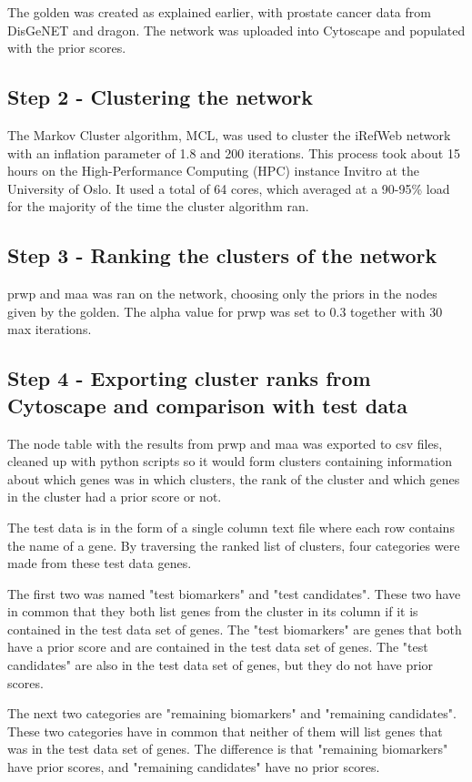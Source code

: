 The \gls{golden} was created as explained earlier, with prostate cancer data
from DisGeNET and \gls{dragon}. The network was uploaded into Cytoscape and
populated with the prior scores. 

\subsection{Step 2 - Clustering the network}
The Markov Cluster algorithm, MCL, was used to cluster the iRefWeb network with
an inflation parameter of 1.8 and 200 iterations. This process took about 15
hours on the High-Performance Computing (HPC) instance Invitro at the University
of Oslo. It used a total of 64 cores, which averaged at a 90-95\% load for the
majority of the time the cluster algorithm ran.

\subsection{Step 3 - Ranking the clusters of the network}
\gls{prwp} and \gls{maa} was ran on the network, choosing only the priors in the
nodes given by the \gls{golden}. The alpha value for \gls{prwp} was set to 0.3
together with 30 max iterations.

\subsection{Step 4 - Exporting cluster ranks from Cytoscape and comparison with test data}
The node table with the results from \gls{prwp} and \gls{maa} was exported to
csv files, cleaned up with python scripts so it would form clusters containing
information about which genes was in which clusters, the rank of the cluster and
which genes in the cluster had a prior score or not.

The test data is in the form of a single column text file where each row
contains the name of a gene. By traversing the ranked list of clusters, four
categories were made from these test data genes. 

The first two was named "test biomarkers" and "test candidates". These two have
in common that they both list genes from the cluster in its column if it is
contained in the test data set of genes. The "test biomarkers" are genes that
both have a prior score and are contained in the test data set of genes. The
"test candidates" are also in the test data set of genes, but they do not have
prior scores.

The next two categories are "remaining biomarkers" and "remaining candidates".
These two categories have in common that neither of them will list genes that
was in the test data set of genes. The difference is that "remaining biomarkers"
have prior scores, and "remaining candidates" have no prior scores.

